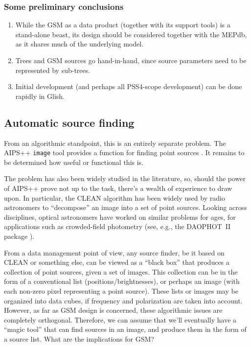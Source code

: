 \documentclass[]{lofar}
\begin{document}
\subsubsection{Some preliminary conclusions}
  
  \begin{enumerate}
  
  \item While the GSM as a data product (together with its support tools) is a
  stand-alone beast, its design should be considered together with the MEPdb, as
  it shares much of the underlying model.
  
  \item Trees and GSM sources go hand-in-hand, since source parameters need 
  to be represented by sub-trees.
  
  \item Initial development (and perhaps all PSS4-scope development) can be done
  rapidly in Glish.
  
  \end{enumerate}
  
\subsection{Automatic source finding}
  
  From an algorithmic standpoint, this is an entirely separate problem. The
  AIPS++ {\tt image} tool provides a function for finding point sources
  \cite{image-fs}. It remains to be determined how useful or functional this is.
  
  The problem has also been widely studied in the literature, so, should the
  power of AIPS++ prove not up to the task, there's a wealth of experience to
  draw upon. In particular, the CLEAN algorithm \cite{clean} \cite{clean2} has
  been widely used by radio astronomers to ``decompose'' an image into a set of
  point sources.  Looking across disciplines, optical astronomers have worked on
  similar problems for ages, for applications such as crowded-field photometry
  (see, e.g., the DAOPHOT~II package \cite{daophot}).
  
  From a data management point of view, any source finder, be it based on CLEAN
  or something else, can be viewed as a ``black box'' that produces a collection
  of point sources, given a set of images. This collection can be in the form of
  a conventional list (positions/brightnesses), or perhaps an image (with each
  non-zero pixel representing a point source). These lists or images may be
  organized into data cubes, if frequency and polarization are taken into
  account. However, as far as GSM design is concerned, these algorithmic issues
  are completely orthogonal. Therefore, we can assume that we'll eventually have
  a ``magic tool'' that can find sources in an image, and produce them in the form
  of a source list. What are the implications for GSM?
  
\end{document}
